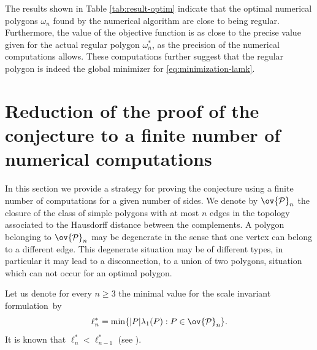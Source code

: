The results shown in Table \ref{tab:result-optim} indicate that the optimal numerical polygons $\omega_n$ found by the numerical algorithm are close to being regular. Furthermore, the value of the objective function is as close to the precise value given for the actual regular polygon $\omega_n^*$, as the precision of the numerical computations allows. These computations further suggest that the regular polygon is indeed the global minimizer for \eqref{eq:minimization-lamk}.

\section{Reduction of the proof of the conjecture to a finite number of numerical computations}\label{bobu200}

In this section we provide a strategy for proving the conjecture using a finite number of computations for a given number of sides. We denote by $ \ov { \mathcal P}_n $ the closure of the class of simple polygons with at most $n$ edges in the topology associated to the Hausdorff distance between the complements. A polygon belonging to $ \ov { \mathcal P}_n $ may be degenerate in the sense that one vertex can belong to a different edge. This degenerate situation may be of different types, in particular it may lead to a disconnection, \ie to a union of two polygons, situation which can not occur for an optimal polygon.

Let us denote for every $n \ge 3$ the minimal value for the scale invariant formulation~by
\[
\ell_n^*= \min \{|P|\lambda_1(P) : P \in \ov { \mathcal P}_n \}.
\]
It is known that $\ell_n^* < \ell_{n-1}^*$ (see \cite[\S 3.3]{henroteigs}).

